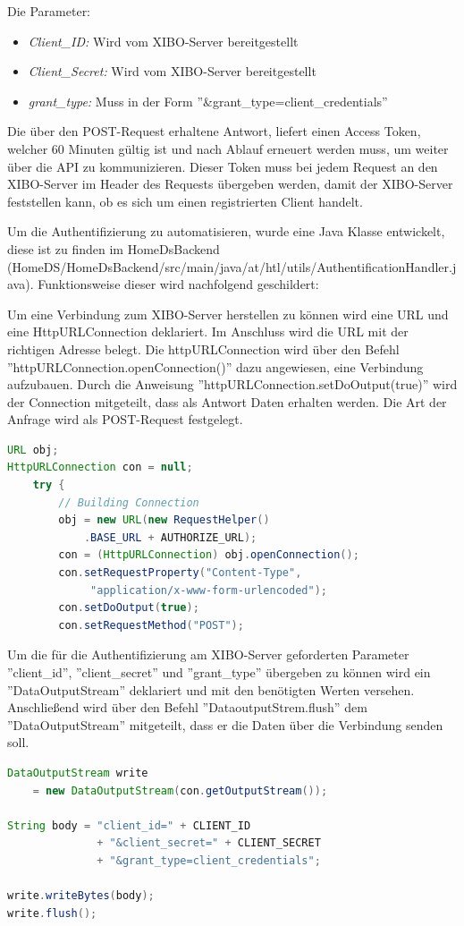 Die Parameter: 
\begin{itemize}
	\item {\em Client\_ID:} Wird vom XIBO-Server bereitgestellt
	\item {\em Client\_Secret:} Wird vom XIBO-Server bereitgestellt
	\item{\em grant\_type:} Muss in der Form ''&grant\_type=client\_credentials''
\end{itemize}

Die über den POST-Request erhaltene Antwort, liefert einen Access Token, welcher 60 Minuten gültig ist und nach Ablauf erneuert werden muss, um weiter über die API zu kommunizieren.
Dieser Token muss bei jedem Request an den XIBO-Server im Header des Requests übergeben werden, damit der XIBO-Server feststellen kann, ob es sich um einen registrierten Client handelt.


Um die Authentifizierung zu automatisieren, wurde eine Java Klasse entwickelt, diese ist zu finden im HomeDsBackend (HomeDS/HomeDsBackend/src/main/java/at/htl/utils/AuthentificationHandler.java). Funktionsweise dieser wird nachfolgend geschildert: 

Um eine Verbindung zum XIBO-Server herstellen zu können wird eine URL und eine HttpURLConnection deklariert. Im Anschluss wird die URL mit der richtigen Adresse belegt. Die httpURLConnection wird über den Befehl ''httpURLConnection.openConnection()'' dazu angewiesen, eine Verbindung aufzubauen. Durch die Anweisung ''httpURLConnection.setDoOutput(true)'' wird der Connection mitgeteilt, dass als Antwort Daten erhalten werden. Die Art der Anfrage wird als POST-Request festgelegt.  \citep{httpurlconnection}

\begin{lstlisting}[language=Java,caption={Erstellen der Verbindung zum Server}]
URL obj;
HttpURLConnection con = null;
	try {
    	// Building Connection
        obj = new URL(new RequestHelper()
        	.BASE_URL + AUTHORIZE_URL);
       	con = (HttpURLConnection) obj.openConnection();
        con.setRequestProperty("Content-Type",
             "application/x-www-form-urlencoded");    
        con.setDoOutput(true);
        con.setRequestMethod("POST");
\end{lstlisting}

Um die für die Authentifizierung am XIBO-Server geforderten Parameter ''client\_id'', ''client\_secret'' und ''grant\_type'' übergeben zu können wird ein ''DataOutputStream'' deklariert und mit den benötigten Werten versehen. Anschließend wird über den Befehl  ''DataoutputStrem.flush'' dem ''DataOutputStream'' mitgeteilt, dass er die Daten über die Verbindung senden soll.
\begin{lstlisting}[language=Java,caption={Erstellen und senden des JSON-Body}]
DataOutputStream write 
	= new DataOutputStream(con.getOutputStream());
	 
String body = "client_id=" + CLIENT_ID
              + "&client_secret=" + CLIENT_SECRET
              + "&grant_type=client_credentials";

write.writeBytes(body);
write.flush();
\end{lstlisting}


